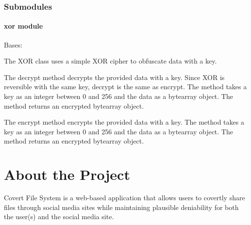 \documentclass[letterpaper,12pt,openany,oneside]{sphinxmanual}
\begin{document}
\subsection{Submodules}
\label{Encryption:submodules}

\subsubsection{xor module}
\label{Encryption:xor-module}\label{Encryption:module-covertFS.Encryption.xor}

\begin{fulllineitems}
\label{Encryption:covertFS.Encryption.xor.XOR}
Bases: 

The XOR class uses a simple XOR cipher to obfuscate data with a key.

\begin{fulllineitems}
\label{Encryption:covertFS.Encryption.xor.XOR.decrypt}
The decrypt method decrypts the provided data with a key.
Since XOR is reversible with the same key, decrypt is the
same as encrypt.
The method takes a key as an integer between 0 and 256 and
the data as a bytearray object.
The method returns an encrypted bytearray object.

\end{fulllineitems}


\begin{fulllineitems}
\label{Encryption:covertFS.Encryption.xor.XOR.encrypt}
The encrypt method encrypts the provided data with a key.
The method takes a key as an integer between 0 and 256 and
the data as a bytearray object.
The method returns an encrypted bytearray object.

\end{fulllineitems}


\end{fulllineitems}



\chapter{About the Project}
\label{index:about-the-project}
Covert File System is a web-based application that allows users to covertly share files through social media sites while maintaining plausible deniability for both the user(s) and the social media site.
\end{document}

